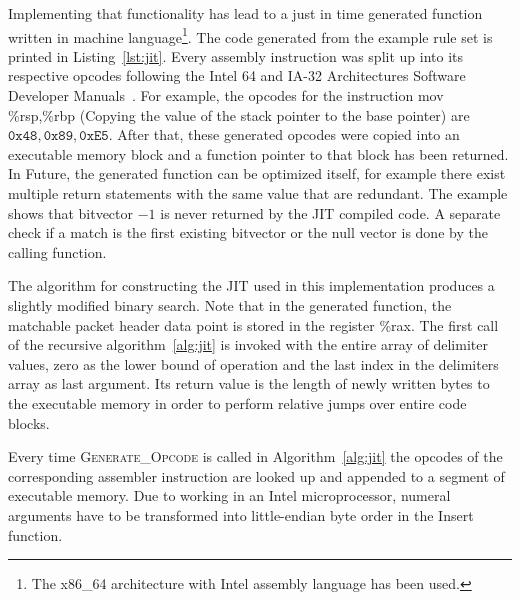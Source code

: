 \documentclass[a4paper,
		12pt,
		parskip=full,
		titlepage
		]{scrartcl}
\begin{document}
Implementing that functionality has lead to a just in time generated function written in machine 
language\footnote{The x86\_64 architecture with Intel assembly language has been used.}.
The code generated from the example rule set is printed in Listing~\ref{lst:jit}.
Every assembly instruction was split up into its respective opcodes following the 
Intel 64 and IA-32 Architectures Software Developer Manuals~\cite{intelsys}.
For example, the opcodes for the instruction 
\textsf{mov \%rsp,\%rbp} (Copying the value of the stack pointer to the base pointer) 
are $\texttt{0x48}, \texttt{0x89}, \texttt{0xE5}$.
After that, these generated opcodes were copied into an executable memory block and a function pointer to that block has been returned.
In Future, the generated function can be optimized itself, for example there exist multiple 
return statements with the same value that are redundant.
The example shows that bitvector $-1$ is never returned by the JIT compiled code.
A separate check if a match is the first existing bitvector or the null 
vector is done by the calling function.

\begin{multicols}{2}
Assembler},
    breaklines=true,
    basicstyle=\footnotesize,
    numbers=left,
    xleftmargin=5.0ex,
    basicstyle=\footnotesize\ttfamily,
    keywordstyle=\bfseries\color{red},
    commentstyle=\itshape\color{grey},
    identifierstyle=\color{blue},
    morekeywords={retq,cmpq},
    ]
    {jit_listing.asm}
\end{multicols}
\vspace{-2ex}
\label{lst:jit}
\vspace{2ex}

The algorithm for constructing the JIT used in this implementation produces a slightly modified binary search.
Note that in the generated function, the matchable packet header data point is stored in the register \textsf{\%rax}.
The first call of the recursive algorithm~\ref{alg:jit} is invoked with the entire array of delimiter values,
zero as the lower bound of operation and the last index in the delimiters array as last argument.
Its return value is the length of newly written bytes to the executable memory in order to perform relative jumps over entire code blocks.

Every time \textsc{Generate\_Opcode} is called in Algorithm~\ref{alg:jit} the opcodes 
of the corresponding assembler instruction are looked up and appended to a segment of executable memory.
Due to working in an Intel microprocessor, numeral arguments have to be 
transformed into little-endian byte order in the \textsf{Insert} function.
\end{document}
